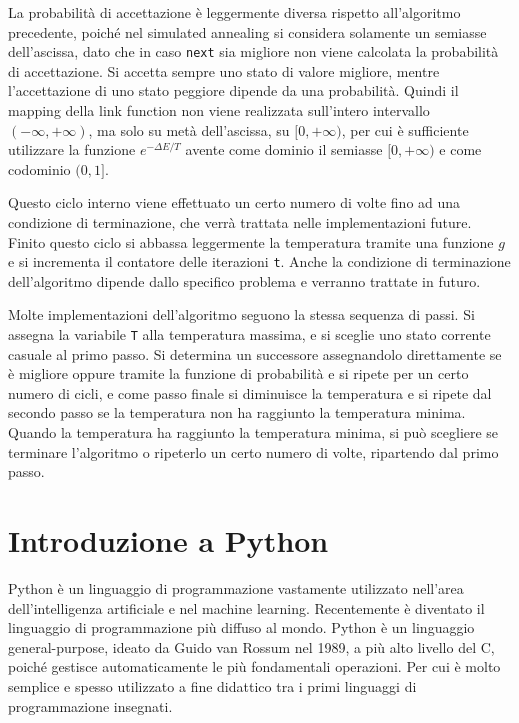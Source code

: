 \documentclass{article}
\numberwithin{equation}{subsection}
\begin{document}
La probabilità di accettazione è leggermente diversa rispetto all'algoritmo precedente, poiché nel simulated annealing si considera solamente un semiasse dell'ascissa, dato che in caso \verb|next| sia migliore non viene calcolata la probabilità di accettazione. Si accetta sempre 
uno stato di valore migliore, mentre l'accettazione di uno stato peggiore dipende da una probabilità. 
Quindi il mapping della link function non viene realizzata sull'intero intervallo $(-\infty,+\infty)$, ma solo su metà dell'ascissa, su $[0,+\infty)$, per cui è 
sufficiente utilizzare la funzione $e^{-\Delta E/T}$ avente come dominio il semiasse $[0,+\infty)$ e come codominio $(0,1]$. 

Questo ciclo interno viene effettuato un certo numero di volte fino ad una condizione di 
terminazione, che verrà trattata nelle implementazioni future. 
Finito questo ciclo si abbassa leggermente la temperatura tramite una funzione $g$ e si incrementa il contatore 
delle iterazioni \verb|t|. 
Anche la condizione di terminazione dell'algoritmo dipende dallo specifico problema 
e verranno trattate in futuro. 


Molte implementazioni dell'algoritmo seguono la stessa sequenza di passi. Si assegna la variabile \verb|T| alla temperatura massima, e si sceglie uno stato corrente 
casuale al primo passo. Si determina un successore assegnandolo direttamente se è migliore oppure tramite la funzione di probabilità e si ripete per un certo numero di 
cicli, e come passo finale si diminuisce la temperatura e si ripete dal secondo passo se la temperatura non ha 
raggiunto la temperatura minima. Quando la temperatura ha raggiunto la temperatura minima, si può scegliere se terminare l'algoritmo o ripeterlo un certo numero di 
volte, ripartendo dal primo passo. 

\clearpage

\section{Introduzione a Python}

Python è un linguaggio di programmazione vastamente utilizzato nell'area dell'intelligenza artificiale e nel machine learning. Recentemente è diventato il linguaggio di 
programmazione più diffuso al mondo. Python è un linguaggio general-purpose, ideato da Guido van Rossum nel 1989, a più alto livello del C, poiché gestisce automaticamente le 
più fondamentali operazioni. Per cui è molto semplice e spesso utilizzato a fine didattico tra i primi linguaggi di programmazione insegnati. 
\end{document}
